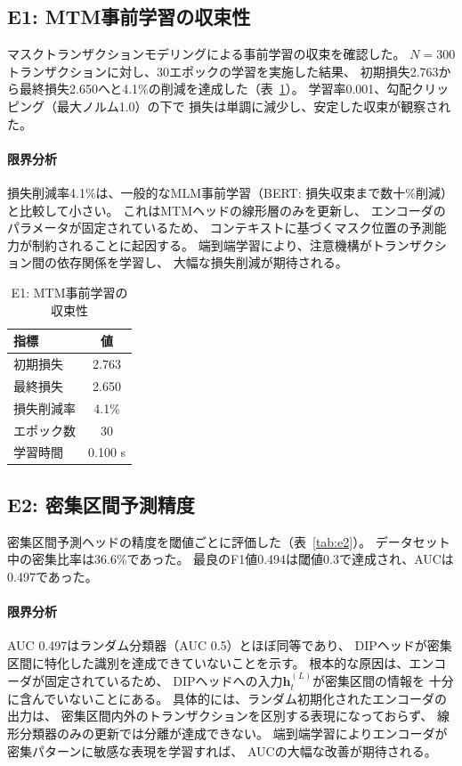 \documentclass[sigconf,nonacm]{acmart}
\begin{document}
\subsection{E1: MTM事前学習の収束性}

マスクトランザクションモデリングによる事前学習の収束を確認した。
$N=300$トランザクションに対し、30エポックの学習を実施した結果、
初期損失2.763から最終損失2.650へと4.1\%の削減を達成した（表~\ref{tab:e1}）。
学習率0.001、勾配クリッピング（最大ノルム1.0）の下で
損失は単調に減少し、安定した収束が観察された。

\paragraph{限界分析}
損失削減率4.1\%は、一般的なMLM事前学習（BERT: 損失収束まで数十\%削減）
と比較して小さい。
これはMTMヘッドの線形層のみを更新し、
エンコーダのパラメータが固定されているため、
コンテキストに基づくマスク位置の予測能力が制約されることに起因する。
端到端学習により、注意機構がトランザクション間の依存関係を学習し、
大幅な損失削減が期待される。

\begin{table}[t]
\centering
\caption{E1: MTM事前学習の収束性}
\label{tab:e1}
\begin{tabular}{lc}
\toprule
指標 & 値 \\
\midrule
初期損失 & 2.763 \\
最終損失 & 2.650 \\
損失削減率 & 4.1\% \\
エポック数 & 30 \\
学習時間 & 0.100 s \\
\bottomrule
\end{tabular}
\end{table}

\subsection{E2: 密集区間予測精度}

密集区間予測ヘッドの精度を閾値ごとに評価した（表~\ref{tab:e2}）。
データセット中の密集比率は36.6\%であった。
最良のF1値0.494は閾値0.3で達成され、AUCは0.497であった。

\paragraph{限界分析}
AUC 0.497はランダム分類器（AUC 0.5）とほぼ同等であり、
DIPヘッドが密集区間に特化した識別を達成できていないことを示す。
根本的な原因は、エンコーダが固定されているため、
DIPヘッドへの入力$\mathbf{h}_t^{(L)}$が密集区間の情報を
十分に含んでいないことにある。
具体的には、ランダム初期化されたエンコーダの出力は、
密集区間内外のトランザクションを区別する表現になっておらず、
線形分類器のみの更新では分離が達成できない。
端到端学習によりエンコーダが密集パターンに敏感な表現を学習すれば、
AUCの大幅な改善が期待される。
\end{document}

